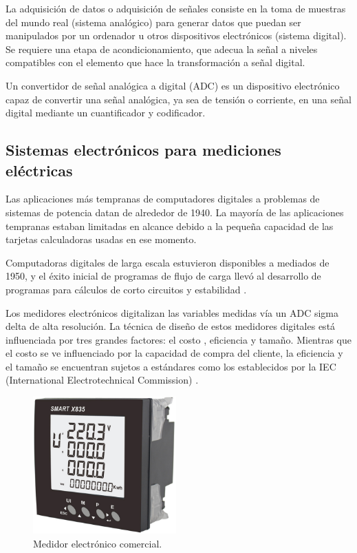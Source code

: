 La adquisición de datos o adquisición de señales consiste en la toma de muestras del mundo real (sistema analógico) para generar datos que puedan ser manipulados por un ordenador u otros dispositivos electrónicos (sistema digital). Se requiere una etapa de acondicionamiento, que adecua la señal a niveles compatibles con el elemento que hace la transformación a señal digital\cite{NIDataAdquisition}.

Un convertidor de señal analógica a digital (ADC) es un dispositivo electrónico capaz de convertir una señal analógica, ya sea de tensión o corriente, en una señal digital mediante un cuantificador y codificador.


\subsection{Sistemas electrónicos para mediciones eléctricas}

Las aplicaciones más tempranas de computadores digitales a problemas de sistemas de potencia datan de alrededor de 1940. La mayoría de las aplicaciones tempranas estaban limitadas en alcance debido a la pequeña capacidad de las tarjetas calculadoras usadas en ese momento. 

Computadoras digitales de larga escala estuvieron disponibles a mediados de 1950, y el éxito inicial de programas de flujo de carga llevó al desarrollo de programas para cálculos de corto circuitos y estabilidad \citep{761852}.

Los medidores electrónicos digitalizan las variables medidas vía un ADC sigma delta  de alta resolución. La técnica de diseño de estos medidores digitales está influenciada por tres grandes factores: el costo , eficiencia y tamaño. Mientras que el costo se ve influenciado por la capacidad de compra del cliente, la eficiencia y el tamaño se encuentran sujetos a estándares como los establecidos por la IEC (International Electrotechnical Commission) \cite{articleDM}.

\begin{figure}[h]
	\centering
	\includegraphics[width=55mm,keepaspectratio]{Figures/3931_1.png}
	\caption{Medidor electrónico comercial.}
	\label{fig:texmaker}
\end{figure}

